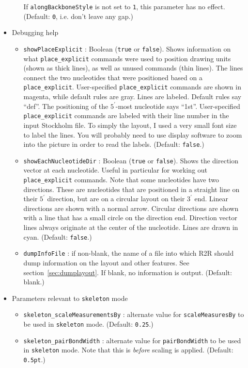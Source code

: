 \documentclass[letterpaper,12pt]{report}
\begin{document}
\begin{itemize}
\begin{itemize}
If {\tt alongBackboneStyle} is not set to {\tt 1}, this parameter has no effect.
(Default: {\tt 0}, i.e. don't leave any gap.)
	\end{itemize}
\item Debugging help
	\begin{itemize}
	\item {\tt showPlaceExplicit} : Boolean ({\tt true} or {\tt false}).
	Shows information on what {\tt place\_explicit} commands were used to position drawing units (shown as thick lines),
	as well as unused commands (thin lines).  
	The lines connect the two nucleotides that were positioned based on a {\tt place\_explicit}.
	User-specified {\tt place\_explicit} commands are shown in magenta,
	while default rules are gray.  Lines are labeled.  Default rules say ``def''.  The positioning of the $5^\prime$-most
	nucleotide says ``1st''.  User-specified {\tt place\_explicit} commands are labeled with their line number in the
	input Stockholm file.
	To simply the layout, I used a very small font size to label the lines.  You will probably need to use display software to zoom into the picture in order to read the labels.
	(Default: {\tt false}.)
	\item {\tt showEachNucleotideDir} : Boolean ({\tt true} or {\tt false}).
	Shows the direction vector at each nucleotide.  Useful in particular for working out {\tt place\_explicit} commands.
	Note that some nucleotides have two directions.  These are nucleotides that are positioned in a straight line on their
	$5^\prime$ direction, but are on a circular layout on their $3^\prime$ end.  Linear directions are shown with a normal arrow.
	Circular directions are shown with a line that has a small circle on the direction end.
	Direction vector lines always originate at the center of the nucleotide.
	Lines are drawn in cyan.
	(Default: {\tt false}.)
        \item {\tt dumpInfoFile} : if non-blank, the name of a file into which R2R should dump information on the layout and other features.  See section~\ref{sec:dumplayout}.  If blank, no information is output.  (Default: blank.)
	\end{itemize}
\item Parameters relevant to {\tt skeleton} mode
	\begin{itemize}
	\item {\tt skeleton\_scaleMeasurementsBy} : alternate value for {\tt scaleMeasuresBy} to be used in {\tt skeleton} mode.  (Default: {\tt 0.25}.)
	\item {\tt skeleton\_pairBondWidth} : alternate value for {\tt pairBondWidth} to be used in {\tt skeleton} mode.  Note that this is {\em before} scaling is applied. (Default: {\tt 0.5pt}.)

\end{itemize}
\end{itemize}
\end{document}
